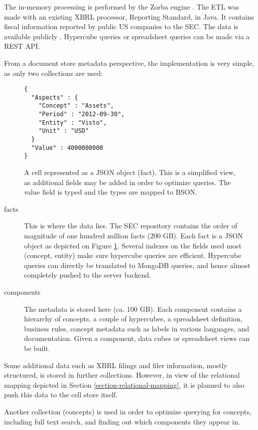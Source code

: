 \documentclass{acm_proc_article-sp}
\begin{document}
The in-memory processing is performed by the Zorba engine \cite{Zorba}. The ETL was made with an existing XBRL processor, Reporting Standard, in Java. It contains fiscal information reported by public US companies to the SEC. The data is available publicly \cite{SECXBRL.info}. Hypercube queries or spreadsheet queries can be made via a REST API.

From a document store metadata perspective, the implementation is very simple, as only two collections are used:


\begin{figure}
\begin{lstlisting}
{
  "Aspects" : {
    "Concept" : "Assets",
    "Period" : "2012-09-30",
    "Entity" : "Visto",
    "Unit" : "USD"
  }
  "Value" : 4000000000
}
\end{lstlisting}
\caption{A cell represented as a JSON object (fact). This is a simplified view, as additional fields may be added in order to optimize queries. The value field is typed and the types are mapped to BSON.}
\label{fig-fact}
\end{figure}


\begin{description}
\item[facts] This is where the data lies. The SEC repository \cite{SECXBRL.info} contains the order of magnitude of one hundred million facts (200 GB). Each fact is a JSON object as depicted on Figure \ref{fig-fact}. Several indexes on the fields used most (concept, entity) make sure hypercube queries are efficient. Hypercube queries can directly be translated to MongoDB queries, and hence almost completely pushed to the server backend.
\item[components] The metadata is stored here (ca. 100 GB). Each component contains a hierarchy of concepts, a couple of hypercubes, a spreadsheet definition, business rules, concept metadata such as labels in various languages, and documentation. Given a component, data cubes or spreadsheet views can be built.
\end{description}

Some additional data such as XBRL filings and filer information, mostly structured, is stored in further collections. However, in view of the relational mapping depicted in Section \ref{section-relational-mapping}, it is planned to also push this data to the cell store itself.

Another collection (concepts) is used in order to optimize querying for concepts, including full text search, and finding out which components they appear in.
\end{document}

